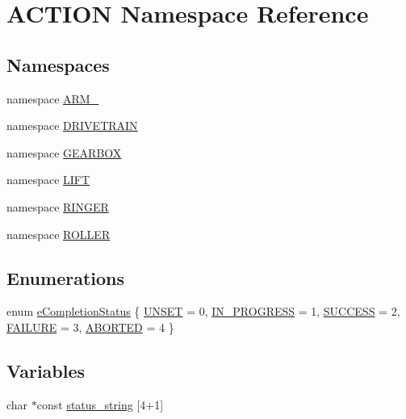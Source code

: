 \hypertarget{namespace_a_c_t_i_o_n}{
\section{\-A\-C\-T\-I\-O\-N \-Namespace \-Reference}
\label{namespace_a_c_t_i_o_n}
}
\subsection*{\-Namespaces}
\begin{DoxyCompactItemize}
\item 
namespace \hyperlink{namespace_a_c_t_i_o_n_1_1_a_r_m__}{\-A\-R\-M\-\_\-}
\item 
namespace \hyperlink{namespace_a_c_t_i_o_n_1_1_d_r_i_v_e_t_r_a_i_n}{\-D\-R\-I\-V\-E\-T\-R\-A\-I\-N}
\item 
namespace \hyperlink{namespace_a_c_t_i_o_n_1_1_g_e_a_r_b_o_x}{\-G\-E\-A\-R\-B\-O\-X}
\item 
namespace \hyperlink{namespace_a_c_t_i_o_n_1_1_l_i_f_t}{\-L\-I\-F\-T}
\item 
namespace \hyperlink{namespace_a_c_t_i_o_n_1_1_r_i_n_g_e_r}{\-R\-I\-N\-G\-E\-R}
\item 
namespace \hyperlink{namespace_a_c_t_i_o_n_1_1_r_o_l_l_e_r}{\-R\-O\-L\-L\-E\-R}
\end{DoxyCompactItemize}
\subsection*{\-Enumerations}
\begin{DoxyCompactItemize}
\item 
enum \hyperlink{namespace_a_c_t_i_o_n_a0b229b6d2869056d015d34a33ee7377c}{e\-Completion\-Status} \{ \*
\hyperlink{namespace_a_c_t_i_o_n_a0b229b6d2869056d015d34a33ee7377ca7b49ca9412464762438a54bebc86373b}{\-U\-N\-S\-E\-T} =  0, 
\hyperlink{namespace_a_c_t_i_o_n_a0b229b6d2869056d015d34a33ee7377cae9f364f6b7b86f940ddd7a5bd2267f02}{\-I\-N\-\_\-\-P\-R\-O\-G\-R\-E\-S\-S} =  1, 
\hyperlink{namespace_a_c_t_i_o_n_a0b229b6d2869056d015d34a33ee7377ca818b238b65cc6c4fe5c46f5e6110f2cf}{\-S\-U\-C\-C\-E\-S\-S} =  2, 
\hyperlink{namespace_a_c_t_i_o_n_a0b229b6d2869056d015d34a33ee7377cab24cb78bd6d115e59df30a6cc2d8169a}{\-F\-A\-I\-L\-U\-R\-E} =  3, 
\*
\hyperlink{namespace_a_c_t_i_o_n_a0b229b6d2869056d015d34a33ee7377cac2d5bb521b1ec612627f1f1d68689cbd}{\-A\-B\-O\-R\-T\-E\-D} =  4
 \}
\end{DoxyCompactItemize}
\subsection*{\-Variables}
\begin{DoxyCompactItemize}
\item 
char $\ast$const \hyperlink{namespace_a_c_t_i_o_n_ae8af90d024079cba1f31a9517608ce29}{status\-\_\-string} \mbox{[}4+1\mbox{]}
\end{DoxyCompactItemize}


